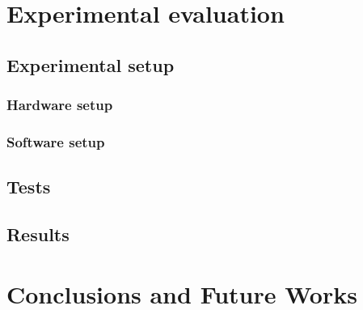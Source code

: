 \section{Experimental evaluation}


\subsection{Experimental setup}
\subsubsection{Hardware setup}
\subsubsection{Software setup}
\subsection{Tests}
\subsection{Results}

\section{Conclusions and Future Works}

